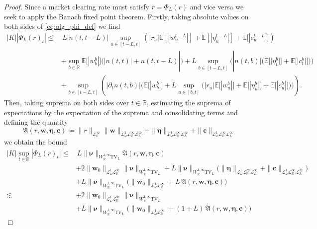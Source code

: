 \documentclass[10pt,a4paper]{amsart}
\theoremstyle{plain}
\theoremstyle{plain}
\theoremstyle{definition}
\theoremstyle{remark}
\newcommand{\TV}{\text{TV}}
\newcommand{\bc}{\mathbf{c}}
\newcommand{\bmeta}{\boldsymbol{\eta}}
\newcommand{\bnu}{\boldsymbol{\nu}}
\newcommand{\bw}{\mathbf{w}}
\newcommand{\mbE}{\mathbb{E}}
\newcommand{\mbR}{\mathbb{R}}
\newcommand{\mfA}{\mathfrak{A}}
\newcommand{\msL}{\mathscr{L}}
\begin{document}
\begin{proof}
Since a market clearing rate must satisfy $r = \Phi_L(r)$ and vice versa we seek to apply the Banach fixed point theorem. Firstly, taking absolute values on both sides of \eqref{eq:olg_phi_def} we find
%
  \begin{equation*}
	\begin{aligned}
	|K||\Phi_L(r)_t| \leq &\, L|n(t,t-L)|\sup_{u\in [t-L,t]}\left( |r_u| \mbE\left[|w^{t-L}_u |\right] +  \mbE\left[|\eta^{t-L}_u|\right]  + \mbE\big[|c^{t-L}_u |\big]\right) \\
		&+ \sup_{b\in \mbR}\mbE\big[|w^b_b|\big] \Big(|n(t,t)|+n(t,t-L)|\Big) +  L \sup_{b\in [t-L,t]} \Big(|n(t,b)|\big(\mbE\big[|\eta^b_t|\big] +  \mbE\big[|c^b_t |\big]\big)\Big) \\
		&+ \sup_{b\in [t-L,t]}\left(|\partial_t n (t,b)| \Big(\mbE\big[|w^b_b|\big] + L \sup_{u\in [b,t]}\big( |r_u| \mbE\big[|w^b_u|\big] + \mbE\big[|\eta^b_u|\big] + \mbE\big[|c^b_u|\big]\big)\Big)\right).
	\end{aligned}
	\end{equation*}
%
Then, taking suprema on both sides over $t\in \mbR$, estimating the suprema of expectations by the expectation of the suprema and consolidating terms and defining the quantity
%
\begin{equation*}
    \mfA(r,\bw,\bmeta,\bc) \coloneqq \|r\|_{\msL^\infty_\mbR}   \|\bw\|_{\msL^1_\omega \msL^\infty_{\mbR}\msL^\infty_L } +  \|\bmeta\|_{ \msL^1_\omega \msL^\infty_{\mbR}\msL^\infty_L}  + \|\bc\|_{\msL^1_\omega \msL^\infty_{\mbR}\msL^\infty_L }
\end{equation*}
%
we obtain the bound
%
 \begin{equation*}
	\begin{aligned}
		|K|\sup_{t\in \mbR}|\Phi_L(r)_t| \leq &\, L\|\bnu\|_{W^{1,\infty}_{\mbR}\TV_L} \mfA(r,\bw,\bmeta,\bc) \\
		&+ 2\|\bw_0\|_{\msL^1_\omega \msL^\infty_\mbR}\|\bnu\|_{W^{1,\infty}_{\mbR}\TV_L} +  L \|\bnu\|_{W^{1,\infty}_{\mbR} \TV_L}\Big(\|\bmeta\|_{ \msL^1_\omega \msL^\infty_{\mbR}\msL^\infty_L}  + \|\bc\|_{\msL^1_\omega \msL^\infty_{\mbR}\msL^\infty_L }\Big) \\
		&+ L \|\bnu\|_{W^{1,\infty}_{\mbR}\TV_L} \Big(\|\bw_0\|_{\msL^1_\omega \msL^\infty_\mbR}+  L \, \mfA(r,\bw,\bmeta,\bc)\Big)\\
		\lesssim \, &+ 2\|\bw_0\|_{\msL^1_\omega \msL^\infty_\mbR}\|\bnu\|_{W^{1,\infty}_{\mbR}\TV_L} \\
		& + L \|\bnu\|_{W^{1,\infty}_{\mbR}\TV_L} \Big(\|\bw_0\|_{\msL^1_\omega \msL^\infty_\mbR}+  (1+L)\,  \mfA(r,\bw,\bmeta,\bc)\Big)
	\end{aligned}
\end{equation*}


\end{proof}
\end{document}
